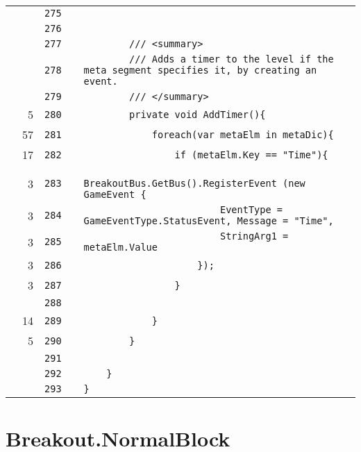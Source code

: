 \documentclass[a4paper,landscape,10pt]{article}
\begin{document}
\begin{longtable}[l]{lrrll}
\cellcolor{gray} &  & \verb~275~ & & \verb~~\\
\cellcolor{gray} &  & \verb~276~ & & \verb~~\\
\cellcolor{gray} &  & \verb~277~ & & \verb~        /// <summary>~\\
\cellcolor{gray} &  & \verb~278~ & & \verb~        /// Adds a timer to the level if the meta segment specifies it, by creating an event.~\\
\cellcolor{gray} &  & \verb~279~ & & \verb~        /// </summary>~\\
\cellcolor{green} & 5 & \verb~280~ & & \verb~        private void AddTimer(){~\\
\cellcolor{green} & 57 & \verb~281~ & & \verb~            foreach(var metaElm in metaDic){~\\
\cellcolor{green} & 17 & \verb~282~ & & \verb~                if (metaElm.Key == "Time"){~\\
\cellcolor{green} & 3 & \verb~283~ & & \verb~                    BreakoutBus.GetBus().RegisterEvent (new GameEvent {~\\
\cellcolor{green} & 3 & \verb~284~ & & \verb~                        EventType = GameEventType.StatusEvent, Message = "Time",~\\
\cellcolor{green} & 3 & \verb~285~ & & \verb~                        StringArg1 = metaElm.Value~\\
\cellcolor{green} & 3 & \verb~286~ & & \verb~                    });~\\
\cellcolor{green} & 3 & \verb~287~ & & \verb~                }~\\
\cellcolor{gray} &  & \verb~288~ & & \verb~~\\
\cellcolor{green} & 14 & \verb~289~ & & \verb~            }~\\
\cellcolor{green} & 5 & \verb~290~ & & \verb~        }~\\
\cellcolor{gray} &  & \verb~291~ & & \verb~~\\
\cellcolor{gray} &  & \verb~292~ & & \verb~    }~\\
\cellcolor{gray} &  & \verb~293~ & & \verb~}~\\
\end{longtable}
\newpage
\section{Breakout.NormalBlock}
\end{document}
